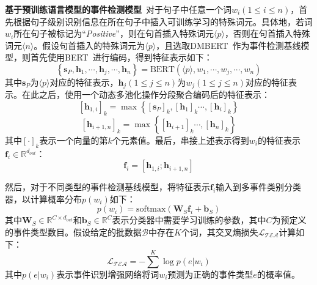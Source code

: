 \textbf{基于预训练语言模型的事件检测模型}~对于句子中任意一个词$w_{i} \left(1 \leq i \leq n\right)$，首先根据句子级别识别信息在所在句子中插入可训练学习的特殊词元。具体地，若词$w_{i}$所在句子被标记为“\emph{Positive}”，则在句首插入特殊词元$\langle p \rangle$，否则在句首插入特殊词元$\langle n \rangle$。假设句首插入的特殊词元为$\langle p \rangle$，且选取DMBERT~\cite{wang2019adversarial}作为事件检测基线模型，则首先使用BERT~\cite{devlin2019bert}进行编码，得到特征表示如下：
\begin{equation}
  \left\{\boldsymbol{s}_P,\boldsymbol{h}_{1},\cdots,\boldsymbol{h}_{j},\cdots,\boldsymbol{h}_{n}\right\}=\textrm{BERT}(\langle p \rangle, w_{1},\cdots, w_{j},\cdots, w_{n})
\end{equation}
其中$\boldsymbol{s}_P$为$\langle p \rangle$对应的特征表示，$\boldsymbol{h}_{j} \left(1 \leq j \leq n\right)$为${w}_{j} \left(1 \leq j \leq n\right)$对应的特征表示。在此之后，使用一个动态多池化操作分段聚合编码后的特征表示：
\begin{equation}
    \left[\boldsymbol{h}_{1, i}\right]_{k}=\max \left\{\left[\boldsymbol{s}_P\right]_{k}, \left[\boldsymbol{h}_{1}\right]_{k} \cdots,\left[\boldsymbol{h}_{i}\right]_{k}\right\}
\end{equation}
\begin{equation}
    \left[\boldsymbol{{h}}_{i+1, n}\right]_{k}=\max \left\{\left[\boldsymbol{h}_{i+1}\right]_{k} \cdots,\left[\boldsymbol{h}_{n}\right]_{k}\right\}
\end{equation}
其中$[\cdot]_{k}$表示一个向量的第$k$个元素值。最后，串接上述表示得到$w_{i}$的特征表示$\boldsymbol{f}_i \in {\mathbb{R}}^{d_{out}}$：
\begin{equation}
\label{input_information}
\boldsymbol{f}_i=\left[\boldsymbol{h}_{1, i};\boldsymbol{{h}}_{i+1, n}\right]
\end{equation}

然后，对于不同类型的事件检测基线模型，将特征表示$\boldsymbol{f}_i$输入到多事件类别分类器，以计算概率分布$p\left(w_{i}\right)$如下：
\begin{equation}
  p\left(w_{i}\right) = \textrm{softmax}\left(\boldsymbol{W}_{S}\boldsymbol{f}_i + \boldsymbol{b}_{S}\right)
\end{equation}
其中$\boldsymbol{W}_{S} \in {\mathbb{R}}^{C \times d_{out}}$和$\boldsymbol{b}_{S} \in {\mathbb{R}}^{C}$表示分类器中需要学习训练的参数，其中$C$为预定义的事件类型数目。假设给定的批数据$\mathcal{B}$中存在$K$个词，其交叉熵损失$\mathcal{L_\textrm{TEA}}$计算如下：
\begin{equation}
  \mathcal{L_\textrm{TEA}} = -\sum^{K} \log p\left(e|w_{i}\right)
 \label{ce}
\end{equation}
其中$p\left(e|w_{i}\right)$表示事件识别增强网络将词$w_{i}$预测为正确的事件类型$e$的概率值。

